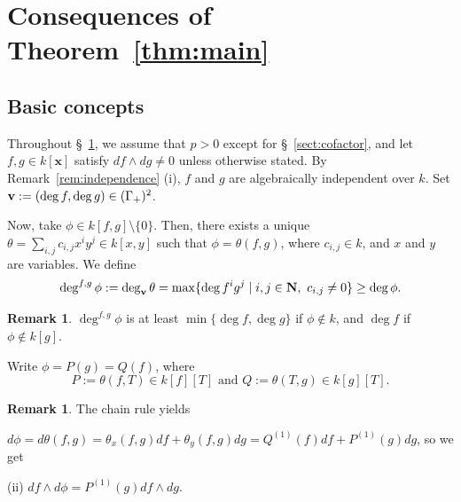 \documentclass{amsart}
\theoremstyle{plain}
\theoremstyle{definition}
\newtheorem{rem}[thm]{Remark}
\newcommand{\zs}{\{ 0\} }
\newcommand{\sm}{\setminus}
\newcommand{\nd}{\noindent}
\newcommand{\N}{{\bf N}}
\newcommand{\x}{{\boldsymbol x}}
\newcommand{\bv}{{\bf v}}
\newcommand{\kx}{k[\x]}
\newcommand{\degw  }{\deg}
\begin{document}
\section{Consequences of Theorem~\ref{thm:main}}\label{sect:consequence}
\setcounter{equation}{0}


\subsection{Basic concepts}\label{subsect:basic concepts}


Throughout \S ~\ref{sect:consequence}, 
we assume that $p>0$ except for \S ~\ref{sect:cofactor}, 
and let $f,g\in \kx $ satisfy 
$df\wedge dg\ne 0$ 
unless otherwise stated. 
By Remark~\ref{rem:independence} (i), 
$f$ and $g$ are algebraically independent over $k$. 
Set $\bv :=(\degw f,\degw g)\in (\Gamma _+)^2$. 


Now, take $\phi \in k[f,g]\sm \zs $. 
Then, 
there exists a unique 
$\theta =\sum _{i,j}c_{i,j}x^iy^j\in k[x,y]$ 
such that 
$\phi =\theta (f,g)$, 
where $c_{i,j}\in k$, 
and $x$ and $y$ are variables. 
We define 
\begin{equation}\label{eq:apparent degree}
\degw ^{f,g}\phi :=\deg _{\bv }\theta 
=\max \{ \degw f^ig^j\mid i,j\in \N ,\ 
c_{i,j}\ne 0\} \ge \deg \phi . 
\end{equation}






\begin{rem}\label{rem:deg^fg}\rm 
$\degw ^{f,g}\phi $ is at least 
$\min \{ \deg f,\deg g\} $ if $\phi \not\in k$, 
and $\deg f$ if $\phi \not\in k[g]$. 
\end{rem}



Write $\phi =P(g)=Q(f)$, where 
\begin{equation}\label{eq:description of q}
P:=\theta (f,T)\in k[f][T]\text{ \ and \ }Q:=\theta (T,g)\in k[g][T]. 
\end{equation}



\begin{rem}\label{rem:chain rule}\rm 
The chain rule yields 

\nd{\rm (i)} 
$d\phi =d\theta (f,g)
=\theta _x(f,g)df+\theta _y(f,g)dg=Q^{(1)}(f)df+P^{(1)}(g)dg$, 
so we get 


\nd (ii) $df\wedge d\phi =P^{(1)}(g)df\wedge dg$. 
\end{rem}
\end{document}
